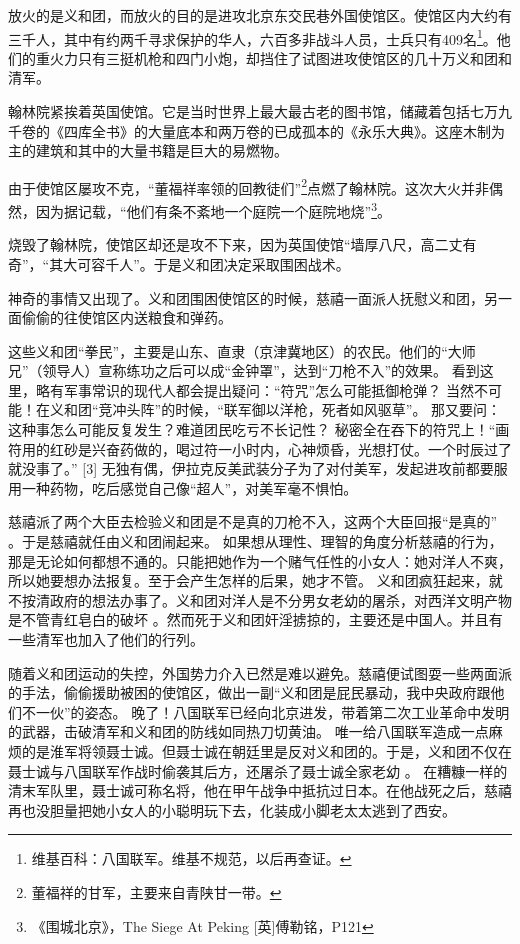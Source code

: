 放火的是义和团，而放火的目的是进攻北京东交民巷外国使馆区。使馆区内大约有三千人，其中有约两千寻求保护的华人，六百多非战斗人员，士兵只有409名\footnote{维基百科：八国联军。维基不规范，以后再查证。}。他们的重火力只有三挺机枪和四门小炮，却挡住了试图进攻使馆区的几十万义和团和清军。

翰林院紧挨着英国使馆。它是当时世界上最大最古老的图书馆，储藏着包括七万九千卷的《四库全书》的大量底本和两万卷的已成孤本的《永乐大典》。这座木制为主的建筑和其中的大量书籍是巨大的易燃物。

由于使馆区屡攻不克，“董福祥率领的回教徒们”\footnote{董福祥的甘军，主要来自青陕甘一带。}点燃了翰林院。这次大火并非偶然，因为据记载，“他们有条不紊地一个庭院一个庭院地烧”\footnote{《围城北京》，The Siege At Peking [英]傅勒铭，P121}。

烧毁了翰林院，使馆区却还是攻不下来，因为英国使馆“墙厚八尺，高二丈有奇”，“其大可容千人”。于是义和团决定采取围困战术。

神奇的事情又出现了。义和团围困使馆区的时候，慈禧一面派人抚慰义和团，另一面偷偷的往使馆区内送粮食和弹药。
\zPar

这些义和团“拳民”，主要是山东、直隶（京津冀地区）的农民。他们的“大师兄”（领导人）宣称练功之后可以成“金钟罩”，达到“刀枪不入”的效果。
看到这里，略有军事常识的现代人都会提出疑问：“符咒”怎么可能抵御枪弹？
当然不可能！在义和团“竞冲头阵”的时候，“联军御以洋枪，死者如风驱草”。
那又要问：这种事怎么可能反复发生？难道团民吃亏不长记性？
秘密全在吞下的符咒上！“画符用的红砂是兴奋药做的，喝过符一小时内，心神烦昏，光想打仗。一个时辰过了就没事了。” [3]
无独有偶，伊拉克反美武装分子为了对付美军，发起进攻前都要服用一种药物，吃后感觉自己像“超人”，对美军毫不惧怕。

慈禧派了两个大臣去检验义和团是不是真的刀枪不入，这两个大臣回报“是真的” 。于是慈禧就任由义和团闹起来。
如果想从理性、理智的角度分析慈禧的行为，那是无论如何都想不通的。只能把她作为一个赌气任性的小女人：她对洋人不爽，所以她要想办法报复。至于会产生怎样的后果，她才不管。
义和团疯狂起来，就不按清政府的想法办事了。义和团对洋人是不分男女老幼的屠杀，对西洋文明产物是不管青红皂白的破坏 。然而死于义和团奸淫掳掠的，主要还是中国人。并且有一些清军也加入了他们的行列。

随着义和团运动的失控，外国势力介入已然是难以避免。慈禧便试图耍一些两面派的手法，偷偷援助被困的使馆区，做出一副“义和团是屁民暴动，我中央政府跟他们不一伙”的姿态。
晚了！八国联军已经向北京进发，带着第二次工业革命中发明的武器，击破清军和义和团的防线如同热刀切黄油。
唯一给八国联军造成一点麻烦的是淮军将领聂士诚。但聂士诚在朝廷里是反对义和团的。于是，义和团不仅在聂士诚与八国联军作战时偷袭其后方，还屠杀了聂士诚全家老幼 。
在糟糠一样的清末军队里，聂士诚可称名将，他在甲午战争中抵抗过日本。在他战死之后，慈禧再也没胆量把她小女人的小聪明玩下去，化装成小脚老太太逃到了西安。


